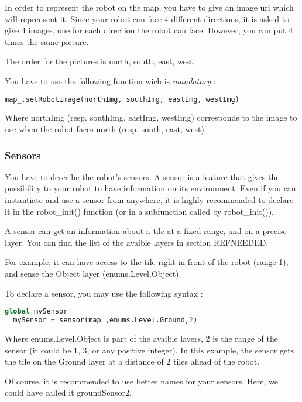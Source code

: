 \documentclass[a4paper,11pt]{article}
\begin{document}
In order to represent the robot on the map, you have to give an image
uri which will reprensent it. Since your robot can face 4 different
directions, it is asked to give 4 images, one for each direction the
robot can face. However, you can put 4 times the same picture.

The order for the pictures is north, south, east, west.

You have to use the following function wich is \emph{mandatory} :

\begin{lstlisting}[language=Python]
map_.setRobotImage(northImg, southImg, eastImg, westImg)
\end{lstlisting}

Where northImg (resp. southImg, eastImg, westImg) corresponds to the
image to use when the robot faces north (resp. south, east, west).

\subsubsection{Sensors}

You have to describe the robot's sensors. A sensor is a feature that
gives the possibility to your robot to have information on its
environment. Even if you can instantiate and use a sensor from
anywhere, it is highly recommended to declare it in the robot\_init()
function (or in a subfunction called by robot\_init()).

A sensor can get an information about a tile at a fixed range, and on
a precise layer. You can find the list of the avaible layers in
section REFNEEDED.

For example, it can have access to the tile right in front of the
robot (range 1), and sense the Object layer (enums.Level.Object).

To declare a sensor, you may use the following syntax :

\begin{lstlisting}[language=Python]
  global mySensor
  mySensor = sensor(map_,enums.Level.Ground,2)
\end{lstlisting}

Where enums.Level.Object is part of the avaible layers, 2 is the range
of the sensor (it could be 1, 3, or any positive integer). In this
example, the sensor gets the tile on the Ground layer at a distance of
2 tiles ahead of the robot.

Of course, it is recommended to use better names for your
sensors. Here, we could have called it groundSensor2.
\end{document}
